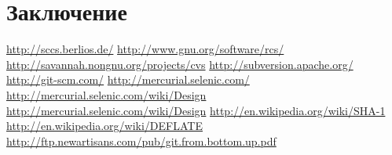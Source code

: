\documentclass[a4paper]{article}
\begin{document}
\section{Заключение}

\newpage

\begin{thebibliography}{99}
   \url{http://sccs.berlios.de/}
   \url{http://www.gnu.org/software/rcs/}
   \url{http://savannah.nongnu.org/projects/cvs}
   \url{http://subversion.apache.org/}
   \url{http://git-scm.com/}
   \url{http://mercurial.selenic.com/}
   \url{http://mercurial.selenic.com/wiki/Design}
   \url{http://mercurial.selenic.com/wiki/Design}
   \url{http://en.wikipedia.org/wiki/SHA-1}
   \url{http://en.wikipedia.org/wiki/DEFLATE}
   \url{http://ftp.newartisans.com/pub/git.from.bottom.up.pdf}
\end{thebibliography}
\end{document}
